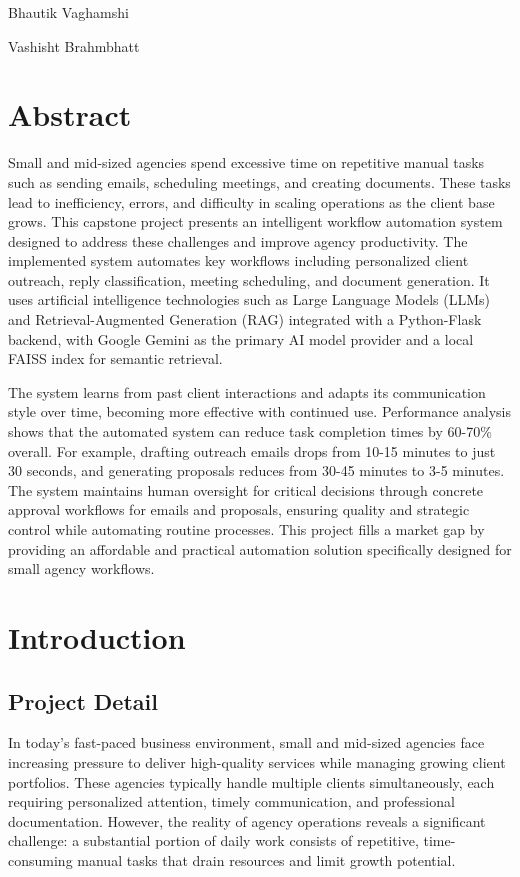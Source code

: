 \documentclass[12pt,a4paper]{report}
\begin{document}
Bhautik Vaghamshi

Vashisht Brahmbhatt

\chapter*{Abstract}
Small and mid-sized agencies spend excessive time on repetitive manual tasks such as sending emails, scheduling meetings, and creating documents. These tasks lead to inefficiency, errors, and difficulty in scaling operations as the client base grows. This capstone project presents an intelligent workflow automation system designed to address these challenges and improve agency productivity. The implemented system automates key workflows including personalized client outreach, reply classification, meeting scheduling, and document generation. It uses artificial intelligence technologies such as Large Language Models (LLMs) and Retrieval-Augmented Generation (RAG) integrated with a Python-Flask backend, with Google Gemini as the primary AI model provider and a local FAISS index for semantic retrieval.

The system learns from past client interactions and adapts its communication style over time, becoming more effective with continued use. Performance analysis shows that the automated system can reduce task completion times by 60-70\% overall. For example, drafting outreach emails drops from 10-15 minutes to just 30 seconds, and generating proposals reduces from 30-45 minutes to 3-5 minutes. The system maintains human oversight for critical decisions through concrete approval workflows for emails and proposals, ensuring quality and strategic control while automating routine processes. This project fills a market gap by providing an affordable and practical automation solution specifically designed for small agency workflows.

\tableofcontents
\listoffigures
\clearpage
{}
\setcounter{page}{1}

\chapter{Introduction}

\section{Project Detail}
In today's fast-paced business environment, small and mid-sized agencies face increasing pressure to deliver high-quality services while managing growing client portfolios. These agencies typically handle multiple clients simultaneously, each requiring personalized attention, timely communication, and professional documentation. However, the reality of agency operations reveals a significant challenge: a substantial portion of daily work consists of repetitive, time-consuming manual tasks that drain resources and limit growth potential.
\end{document}
